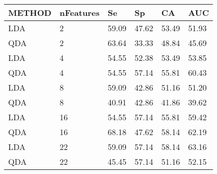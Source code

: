 \begin{table}[!ht]
    \centering
    \begin{tabular}{|l|l|l|l|l|l|}
    \hline
        METHOD & nFeatures & Se & Sp & CA & AUC \\ \hline
        LDA & 2 & 59.09 & 47.62 & 53.49 & 51.93 \\ \hline
        QDA & 2 & 63.64 & 33.33 & 48.84 & 45.69 \\ \hline
        LDA & 4 & 54.55 & 52.38 & 53.49 & 53.85 \\ \hline
        QDA & 4 & 54.55 & 57.14 & 55.81 & 60.43 \\ \hline
        LDA & 8 & 59.09 & 42.86 & 51.16 & 51.20 \\ \hline
        QDA & 8 & 40.91 & 42.86 & 41.86 & 39.62 \\ \hline
        LDA & 16 & 54.55 & 57.14 & 55.81 & 59.42 \\ \hline
        QDA & 16 & 68.18 & 47.62 & 58.14 & 62.19 \\ \hline
        LDA & 22 & 59.09 & 57.14 & 58.14 & 63.16 \\ \hline
        QDA & 22 & 45.45 & 57.14 & 51.16 & 52.15 \\ \hline
    \end{tabular}
\end{table}